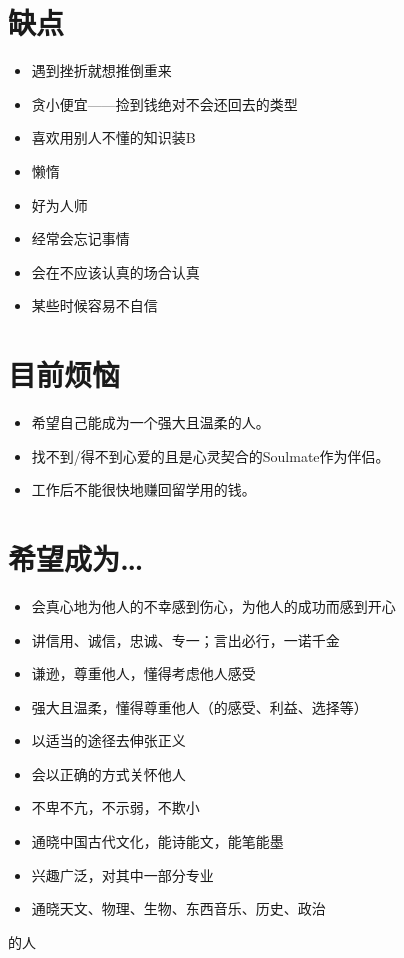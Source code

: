\documentclass[UTF8]{ctexart}
\begin{document}
\section{缺点}
\begin{itemize}
\item 遇到挫折就想推倒重来
\item 贪小便宜——捡到钱绝对不会还回去的类型
\item 喜欢用别人不懂的知识装B
\item 懒惰
\item 好为人师
\item 经常会忘记事情
\item 会在不应该认真的场合认真
\item 某些时候容易不自信
\end{itemize}
\section{目前烦恼}
\begin{itemize}
\item 希望自己能成为一个强大且温柔的人。
\item 找不到/得不到心爱的且是心灵契合的Soulmate作为伴侣。
\item 工作后不能很快地赚回留学用的钱。
\end{itemize}
\section{希望成为…}
\begin{itemize}
\item 会真心地为他人的不幸感到伤心，为他人的成功而感到开心
\item 讲信用、诚信，忠诚、专一；言出必行，一诺千金
\item 谦逊，尊重他人，懂得考虑他人感受
\item 强大且温柔，懂得尊重他人（的感受、利益、选择等）
\item 以适当的途径去伸张正义
\item 会以正确的方式关怀他人
\item 不卑不亢，不示弱，不欺小
\item 通晓中国古代文化，能诗能文，能笔能墨
\item 兴趣广泛，对其中一部分专业
\item 通晓天文、物理、生物、东西音乐、历史、政治
\end{itemize}
的人
\end{document}
